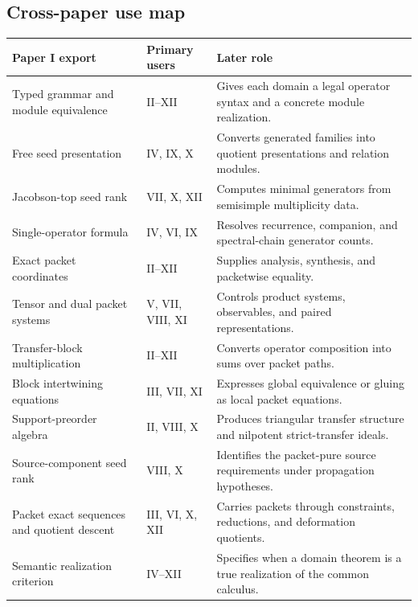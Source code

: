 \documentclass[11pt]{article}
\theoremstyle{definition}
\theoremstyle{remark}
\begin{document}
\subsection{Cross-paper use map}
\begin{center}
\begin{longtable}{@{}>{\raggedright\arraybackslash}p{}>{\raggedright\arraybackslash}p{}>{\raggedright\arraybackslash}p{}@{}}
\toprule
\textbf{Paper I export} & \textbf{Primary users} & \textbf{Later role}\\
\midrule
\endhead
Typed grammar and module equivalence & II--XII & Gives each domain a legal operator syntax and a concrete module realization.\\
Free seed presentation & IV, IX, X & Converts generated families into quotient presentations and relation modules.\\
Jacobson-top seed rank & VII, X, XII & Computes minimal generators from semisimple multiplicity data.\\
Single-operator formula & IV, VI, IX & Resolves recurrence, companion, and spectral-chain generator counts.\\
Exact packet coordinates & II--XII & Supplies analysis, synthesis, and packetwise equality.\\
Tensor and dual packet systems & V, VII, VIII, XI & Controls product systems, observables, and paired representations.\\
Transfer-block multiplication & II--XII & Converts operator composition into sums over packet paths.\\
Block intertwining equations & III, VII, XI & Expresses global equivalence or gluing as local packet equations.\\
Support-preorder algebra & II, VIII, X & Produces triangular transfer structure and nilpotent strict-transfer ideals.\\
Source-component seed rank & VIII, X & Identifies the packet-pure source requirements under propagation hypotheses.\\
Packet exact sequences and quotient descent & III, VI, X, XII & Carries packets through constraints, reductions, and deformation quotients.\\
Semantic realization criterion & IV--XII & Specifies when a domain theorem is a true realization of the common calculus.\\
\bottomrule
\end{longtable}
\end{center}
\end{document}
